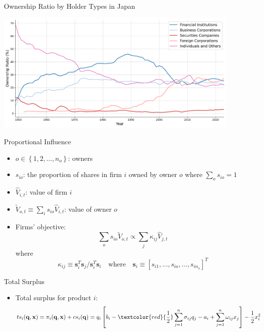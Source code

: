 \documentclass[english,aspectratio=169,handout]{beamer}
\theoremstyle{plain}
\begin{document}
\begin{frame}{Ownership Ratio by Holder Types in Japan}
  \label{ownership_japan} %
  \begin{center}
    \includegraphics[width=12cm]{figures/ownership_ratio_plot.png}
  \end{center}
  \vfill %
  \hfill\hyperlink{identification_overview}{} %
\end{frame}


\begin{frame}{\cite{Rotemberg1984-jz} Proportional Influence}
  \label{rotemberg}
  \begin{itemize}
    \item $o\in\left\{ 1,2,...,n_{o}\right\} $: owners
    \item $s_{io}$: the proportion of shares in firm $i$ owned by owner $o$
          where $\sum_{o}s_{io}=1$
    \item $\widehat{V}_{i,t}$: value of firm $i$
    \item $\widetilde{V}_{o,t}\equiv\sum_{i}s_{io}\widehat{V}_{i,t}$: value
          of owner $o$
    \item Firms' objective:
          \[
            \sum_{o}s_{io}\widetilde{V}_{o,t}\propto\sum_{j}\kappa_{ij}\widehat{V}_{j,t}
          \]
          where
          \[
            \kappa_{ij}\equiv\mathbf{s}_{i}^{T}\mathbf{s}_{j}/\mathbf{s}_{i}^{T}\mathbf{s}_{i} \quad \text{where} \quad \mathbf{s}_{i}\equiv\left[s_{i1},...,s_{io},...,s_{in_{o}}\right]^{T}
          \]
  \end{itemize}
  \vfill %
  \hfill\hyperlink{ownership_weight}{} %
\end{frame}

\begin{frame}{Total Surplus}
  \begin{itemize}
    \item Total surplus for product $i$:
          \[
            ts_{i}(\mathbf{q},\mathbf{x}) = \pi_{i}(\mathbf{q}, \mathbf{x}) +  cs_{i}(\mathbf{q})= q_{i} \left[ b_{i} - \textcolor{red}{\frac{1}{2}}\sum_{j=1}^{n} \sigma_{ij} q_{j} - a_{i} + \sum_{j=1}^{n} \omega_{ij} x_{j} \right] - \frac{1}{2}x_{i}^{2}
          \]
  \end{itemize}
\end{frame}
\end{document}
